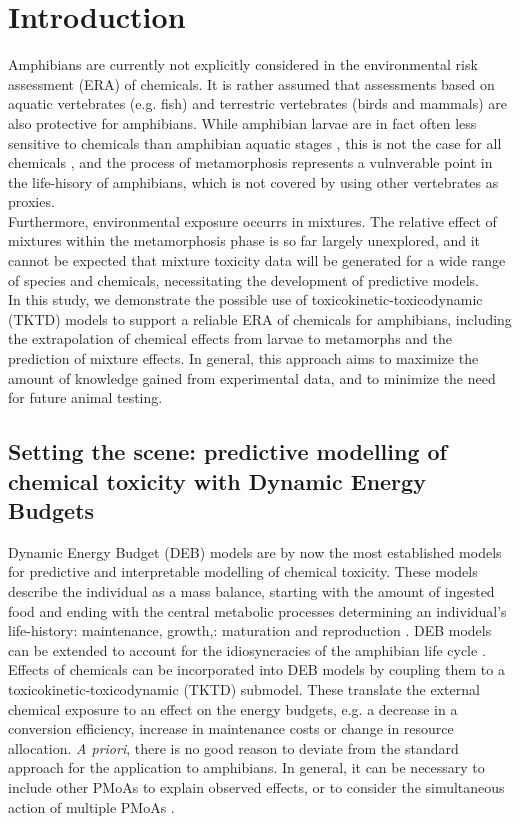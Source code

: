 \section{Introduction}
%
Amphibians are currently not explicitly considered in the environmental risk assessment (ERA) of chemicals. 
It is rather assumed that assessments based on aquatic vertebrates (e.g. fish) 
and terrestric vertebrates (birds and mammals) are also protective for amphibians. 
While amphibian larvae are in fact often less sensitive to chemicals 
than amphibian aquatic stages \citep{weltjeCOMPARATIVEACUTECHRONIC2013}, 
this is not the case for all chemicals \citep{glabermanEvaluatingRoleFish2019}, 
and the process of metamorphosis represents a vulnverable point in the life-hisory of amphibians, 
which is not covered by using other vertebrates as proxies.\\
Furthermore, environmental exposure occurrs in mixtures. 
The relative effect of mixtures within the metamorphosis phase is so far largely unexplored, 
and it cannot be expected that mixture toxicity data will be generated for a wide range 
of species and chemicals, necessitating the development of predictive models.\\
%
In this study, we demonstrate the possible use of toxicokinetic-toxicodynamic (TKTD) models 
to support a reliable ERA of chemicals for amphibians, including the extrapolation 
of chemical effects from larvae to metamorphs and the prediction of mixture effects. 
In general, this approach aims to maximize the amount of knowledge gained 
from experimental data, 
and to minimize the need for future animal testing. \\
%
\subsection{Setting the scene: predictive modelling of chemical toxicity with Dynamic Energy Budgets}
%
Dynamic Energy Budget (DEB) models are by now the most established models 
for predictive and interpretable modelling of chemical toxicity. 
These models describe the individual as a mass balance, 
starting with the amount of ingested food and ending with the central metabolic processes determining an 
individual's life-history:  
maintenance, growth,: maturation and reproduction \citep{kooijmanDynamicEnergyBudget2010,jagerDEBkissQuestSimplest2013}.
DEB models can be extended to account for the idiosyncracies of the amphibian life cycle \citep{romoliDynamicEnergyBudget2024,hansulDynamicModellingAmphibian}.
Effects of chemicals can be incorporated into DEB models by coupling them to a toxicokinetic-toxicodynamic (TKTD) submodel. 
These translate the external chemical exposure to an effect on the energy budgets, 
e.g. a decrease in a conversion efficiency, increase in maintenance costs or change in resource allocation.
\textit{A priori}, there is no good reason to deviate from 
the standard approach for the application to amphibians. 
In general, it can be necessary to include other PMoAs to explain 
observed effects, 
or to consider the simultaneous action of multiple PMoAs \citep{kochMakingSenseLifeHistory2021}.
% 
